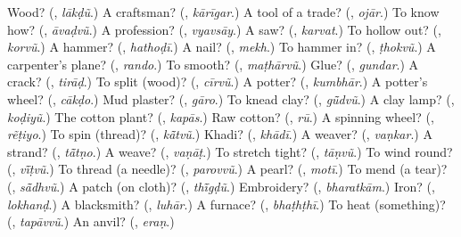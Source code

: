 \begin{tcolorbox}[breakable,colback=teal!4,colframe=teal!35!black,title={Before you move on}]
Wood? (\textbf{}, \emph{lākḍũ}.) A craftsman? (\textbf{}, \emph{kārīgar}.) A tool of a trade? (\textbf{}, \emph{ojār}.) To know how? (\textbf{}, \emph{āvaḍvũ}.) A profession? (\textbf{}, \emph{vyavsāy}.) A saw? (\textbf{}, \emph{karvat}.) To hollow out? (\textbf{}, \emph{korvũ}.) A hammer? (\textbf{}, \emph{hathoḍī}.) A nail? (\textbf{}, \emph{mekh}.) To hammer in? (\textbf{}, \emph{ṭhokvũ}.) A carpenter's plane? (\textbf{}, \emph{rando}.) To smooth? (\textbf{}, \emph{maṭhārvũ}.) Glue? (\textbf{}, \emph{gundar}.) A crack? (\textbf{}, \emph{tirāḍ}.) To split (wood)? (\textbf{}, \emph{cīrvũ}.) A potter? (\textbf{}, \emph{kumbhār}.) A potter's wheel? (\textbf{}, \emph{cākḍo}.) Mud plaster? (\textbf{}, \emph{gāro}.) To knead clay? (\textbf{}, \emph{gū̃dvũ}.) A clay lamp? (\textbf{}, \emph{koḍiyũ}.) The cotton plant? (\textbf{}, \emph{kapās}.) Raw cotton? (\textbf{}, \emph{rū}.) A spinning wheel? (\textbf{}, \emph{rẽṭiyo}.) To spin (thread)? (\textbf{}, \emph{kā̃tvũ}.) Khadi? (\textbf{}, \emph{khādī}.) A weaver? (\textbf{}, \emph{vaṇkar}.) A strand? (\textbf{}, \emph{tā̃tṇo}.) A weave? (\textbf{}, \emph{vaṇāṭ}.) To stretch tight? (\textbf{}, \emph{tāṇvũ}.) To wind round? (\textbf{}, \emph{vī̃ṭvũ}.) To thread (a needle)? (\textbf{}, \emph{parovvũ}.) A pearl? (\textbf{}, \emph{motī}.) To mend (a tear)? (\textbf{}, \emph{sā̃dhvũ}.) A patch (on cloth)? (\textbf{}, \emph{thī̃gḍũ}.) Embroidery? (\textbf{}, \emph{bharatkām}.) Iron? (\textbf{}, \emph{lokhanḍ}.) A blacksmith? (\textbf{}, \emph{luhār}.) A furnace? (\textbf{}, \emph{bhaṭhṭhī}.) To heat (something)? (\textbf{}, \emph{tapāvvũ}.) An anvil? (\textbf{}, \emph{eraṇ}.)
\end{tcolorbox}
